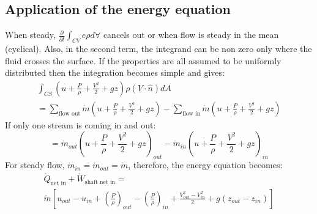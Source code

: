 \documentclass[class=report, crop=false, 12pt,a4paper]{standalone}
\begin{document}
\subsection{Application of the energy equation}
When steady, $\frac{\partial}{\partial t} \int_{CV} e \rho d \forall$ cancels out or when flow is steady in the mean (cyclical). Also, in the second term, the integrand can be non zero only where the fluid crosses the surface. If the properties are all assumed to be uniformly distributed then the integration becomes simple and gives:
\begin{gather}
  \int_{CS} (u + \frac{P}{\rho} + \frac{V^2}{2} + gz) \rho (\underline{V} \cdot \hat{n}) dA\\
  = \sum_{\textrm{flow out}} \dot{m} (u + \frac{P}{\rho} + \frac{V^2}{2} + gz) - \sum_{\textrm{flow in}} \dot{m} (u + \frac{P}{\rho} + \frac{V^2}{2} + gz)
\end{gather}
If only one stream is coming in and out:
\begin{equation}
  = \dot{m}_{out} (u + \frac{P}{\rho} + \frac{V^2}{2} + gz)_{out} - \dot{m}_{in} (u + \frac{P}{\rho} + \frac{V^2}{2} + gz)_{in}
\end{equation}
For steady flow, $\dot{m}_{in} = \dot{m}_{out} = \dot{m}$, therefore, the energy equation becomes:
\begin{multline}
  \dot{Q}_{\textrm{net in}} + \dot{W}_{\textrm{shaft net in}} = \\
  \dot{m} \left[ u_{out} - u_{in} + \left( \frac{P}{\rho} \right)_{out} - \left( \frac{P}{\rho} \right)_{in} + \frac{V_{out}^2 - V_{in}^2}{2} + g(z_{out} - z_{in}) \right]
\end{multline}
\end{document}
